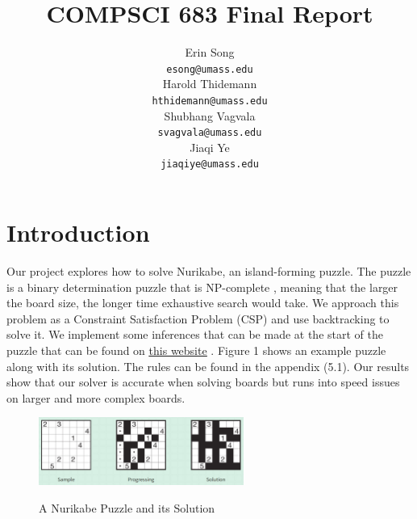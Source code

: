 \documentclass{article}
\title{COMPSCI 683 Final Report}
\author{%
  Erin Song\\
  \texttt{esong@umass.edu} \\
  \And
  Harold Thidemann\\
  \texttt{hthidemann@umass.edu} \\
  \And
  Shubhang Vagvala\\
  \texttt{svagvala@umass.edu} \\
  \And
  Jiaqi Ye\\
  \texttt{jiaqiye@umass.edu} \\
}
\theoremstyle{definition}
\begin{document}
\maketitle

\section{Introduction}\label{sec:intro}
Our project explores how to solve Nurikabe, an island-forming puzzle. The puzzle is a binary determination puzzle that is NP-complete \cite{huttar}, meaning that the larger the board size, the longer time exhaustive search would take. We approach this problem as a Constraint Satisfaction Problem (CSP) and use backtracking to solve it. We implement some inferences that can be made at the start of the puzzle that can be found on \hyperlink{https://www.conceptispuzzles.com/index.aspx?uri=puzzle/nurikabe/techniques}{\underline{this website}} \cite{Inferences}. Figure 1 shows an example puzzle along with its solution. The rules can be found in the appendix (5.1). Our results show that our solver is accurate when solving boards but runs into speed issues on larger and more complex boards. 

\begin{figure}[h]
    \centering
    \includegraphics[width=0.6\textwidth]{example.png} \\
    \caption{A Nurikabe Puzzle and its Solution}
\end{figure}
\end{document}
